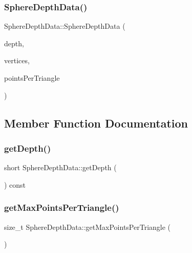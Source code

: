 \mbox{\label{class_sphere_depth_data_a746de4be5c4ff2bdcbdc1517aa88a4d9}} 
\subsubsection{\texorpdfstring{Sphere\+Depth\+Data()}{SphereDepthData()}\hspace{0.1cm}{\footnotesize\ttfamily [2/2]}}
{\footnotesize\ttfamily Sphere\+Depth\+Data\+::\+Sphere\+Depth\+Data (\begin{DoxyParamCaption}\item[{short}]{depth,  }\item[{std\+::vector$<$ float $>$}]{vertices,  }\item[{std\+::vector$<$ std\+::list$<$ Q\+Vector3D $>$ $>$}]{points\+Per\+Triangle }\end{DoxyParamCaption})}



\subsection{Member Function Documentation}
\mbox{\label{class_sphere_depth_data_a925a7e0a5486b49151d823471ebe7fe6}} 
\subsubsection{\texorpdfstring{get\+Depth()}{getDepth()}}
{\footnotesize\ttfamily short Sphere\+Depth\+Data\+::get\+Depth (\begin{DoxyParamCaption}{ }\end{DoxyParamCaption}) const}

\mbox{\label{class_sphere_depth_data_ad151dd50ed037d91aecec6b285a3e342}} 
\subsubsection{\texorpdfstring{get\+Max\+Points\+Per\+Triangle()}{getMaxPointsPerTriangle()}}
{\footnotesize\ttfamily size\+\_\+t Sphere\+Depth\+Data\+::get\+Max\+Points\+Per\+Triangle (\begin{DoxyParamCaption}{ }\end{DoxyParamCaption})}

